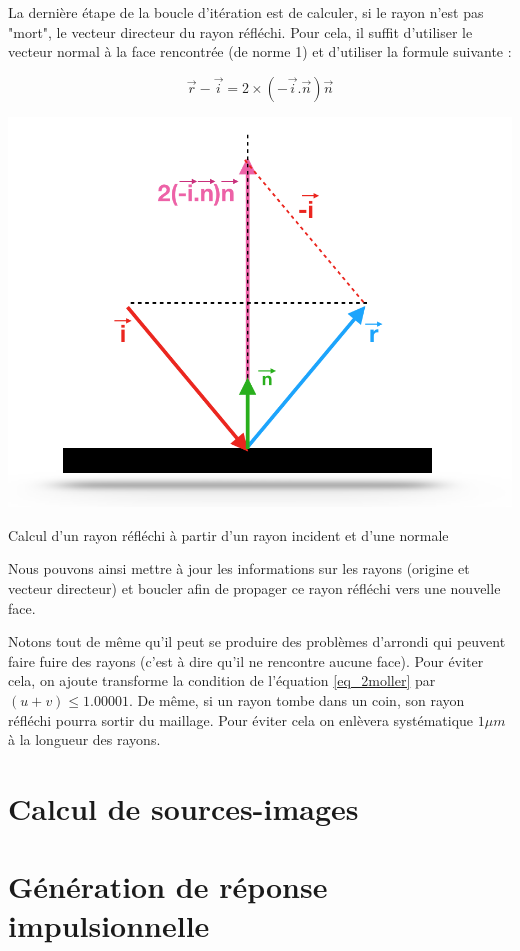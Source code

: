 La dernière étape de la boucle d'itération est de calculer, si le rayon n'est pas "mort", le vecteur directeur du rayon réfléchi. Pour cela, il suffit d'utiliser le vecteur normal à la face rencontrée (de norme 1) et d'utiliser la formule suivante :

\begin{equation}
\overrightarrow{r} - \overrightarrow{i} = 2 \times (-\overrightarrow{i}.\overrightarrow{n})\overrightarrow{n}
\end{equation}

\begin{figureth}
	\includegraphics[width=0.6\linewidth]{images/rayRefl}
	\caption{Calcul d'un rayon réfléchi à partir d'un rayon incident et d'une normale}
	\label{rayRefl}
\end{figureth}

Nous pouvons ainsi mettre à jour les informations sur les rayons (origine et vecteur directeur) et boucler afin de propager ce rayon réfléchi vers une nouvelle face.

Notons tout de même qu'il peut se produire des problèmes d'arrondi qui peuvent faire fuire des rayons (c'est à dire qu'il ne rencontre aucune face). Pour éviter cela, on ajoute transforme la condition de l'équation \ref{eq_2moller} par $(u+v)\leqslant1.00001$. De même, si un rayon tombe dans un coin, son rayon réfléchi pourra sortir du maillage. Pour éviter cela on enlèvera systématique $1\mu m$ à la longueur des rayons.

\section{Calcul de sources-images} \label{sect_si}

\section{Génération de réponse impulsionnelle} \label{sect_rir}

